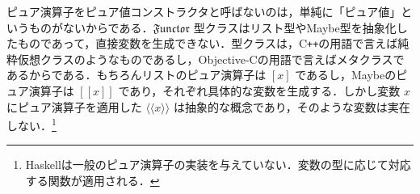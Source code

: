 \documentclass[a4paper]{jsbook}
\def\[{\left[\!\left[}
\def\]{\right]\!\right]}
\newcommand{\programminglanguage}[1]{\textsf{#1}}
\newcommand{\cxx}{\programminglanguage{C}\texttt{++}}
\newcommand{\objectivec}{\programminglanguage{Objective-C}}
\newcommand{\haskell}{\programminglanguage{Haskell}}
\newcommand{\keyword}[1]{{\underline{\emph{#1}}}}
\newcommand{\mType}[1]{\mathbf{#1}}
\newcommand{\mListType}[1]{[\mType{#1}]}
\newcommand{\mMaybeType}[1]{\[\mType{#1}\]}
\newcommand{\mFunctor}[1]{\textit{\textbf{#1}}}
\newcommand{\mTypeConstructor}[1]{\mathit{#1}} %
\newcommand{\mSpecialTypeClass}[1]{\mathfrak{#1}} %
\newcommand{\mFunctorTypeClass}{\mSpecialTypeClass{Functor}}
\newcommand{\mListWith}[1]{\left[#1\right]}
\newcommand{\mTupleWith}[1]{\left(#1\right)}
\newcommand{\mMaybeWith}[1]{\[#1\]}
\newcommand{\mPureWith}[1]{\langle\!\langle#1\rangle\!\rangle}
\DeclareMathOperator{\mMap}{\bullet}
\DeclareMathOperator{\mMapList}{\odot}
\DeclareMathOperator{\mMapMaybe}{\boxdot}
\DeclareMathOperator{\mListTypeConstructor}{\mTypeConstructor{List}}
\DeclareMathOperator{\mMaybeTypeConstructor}{\mTypeConstructor{Maybe}}
\DeclareMathOperator{\mListFunctor}{\mFunctor{List}}
\DeclareMathOperator{\mMaybeFunctor}{\mFunctor{Maybe}}
\newcommand{\mathMaybeMap}{\mathbin{\boxdot}}
\begin{document}
ピュア演算子をピュア値コンストラクタと呼ばないのは，単純に「ピュア値」というものがないからである．$\mFunctorTypeClass$ 型クラスはリスト型やMaybe型を抽象化したものであって，直接変数を生成できない．型クラスは，\cxx の用語で言えば純粋仮想クラスのようなものであるし，\objectivec の用語で言えばメタクラスであるからである．もちろんリストのピュア演算子は $\mListWith{x}$ であるし，Maybeのピュア演算子は $\mMaybeWith{x}$ であり，それぞれ具体的な変数を生成する．しかし変数 $x$ にピュア演算子を適用した $\mPureWith{x}$ は抽象的な概念であり，そのような変数は実在しない．\footnote{\haskell は一般のピュア演算子の実装を与えていない．変数の型に応じて対応する関数が適用される．}





\end{document}

